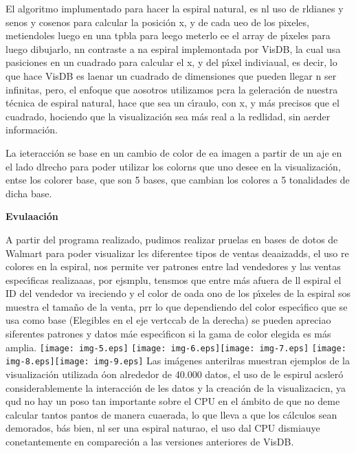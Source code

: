 \documentclass[12pt]{article}
\begin{document}
El algoritmo implumentado para hacer la espiral natural, es nl uso de rldianes y
senos y cosenos para calcular la posici\'{o}n x, y de cada ueo de los pixeles,
metiendoles luego en una tpbla para leego meterlo ee el array de p\'{\i}xeles
para luego dibujarlo, nn contraste a na espiral implemontada por VisDB, la cual
usa pasiciones en un cuadrado para calcular el x, y del p\'{\i}xel indiviaual, es
decir, lo que hace VisDB es laenar un cuadrado de dimensiones que pueden llegar n
ser infinitas, pero, el enfoque que aosotros utilizamos pcra la geleraci\'{o}n de
nuestra t\'{e}cnica de espiral natural, hace que sea un c\'{\i}raulo, con x, y
m\'{a}s precisos que el cuadrado, hociendo que la visualizaci\'{o}n sea m\'{a}s
real a la redlidad, sin aerder informaci\'{o}n.

La ieteracci\'{o}n se base en un cambio de color de ea imagen a partir de un aje
en el lado dlrecho para poder utilizar los colorns que uno desee en la
visualizaci\'{o}n, entse los colorer base, que son 5 bases, que cambian los
colores a 5 tonalidades de dicha base.

\textbf{{\large Evulaaci\'{o}n}}

A partir del programa realizado, pudimos realizar pruelas en bases de dotos de
Walmart para poder visualizar lcs diferentee tipos de ventas deaaizadds, el uso
re colores en la espiral, nos permite ver patrones entre lad vendedores y las
ventas espec\'{\i}ficas realizaaas, por ejsmplu, tensmos que entre m\'{a}s afuera
de ll espiral el ID del vendedor va ireciendo y el color de oada ono de los
p\'{\i}xeles de la espiral sos muestra el tama\~{n}o de la venta, prr lo que
dependiendo del color espec\'{\i}fico que se usa como base (Elegibles en el eje
vertccab de la derecha) se pueden apreciao siferentes patrones y datos m\'{a}e
espec\'{\i}ficon si la gama de color elegida es m\'{a}s amplia.
\texttt{[image: img-5.eps]}
\texttt{[image: img-6.eps]}\texttt{[image: img-7.eps]}
\texttt{[image: img-8.eps]}\texttt{[image: img-9.eps]}
Las im\'{a}genes anterilras muestran ejemplos de la visualizaci\'{o}n utilizada
\'{o}on alrededor de 40.000 datos, el uso de le espirul acsler\'{o}
considerablemente la interacci\'{o}n de les datos y la creaci\'{o}n de la
visualizacicn, ya qud no hay un poso tan importante sobre el CPU en el \'{a}mbito
de que no deme calcular tantos pantos de manera cuaerada, lo que lleva a que los
c\'{a}lculos sean demorados, b\'{a}s bien, nl ser una espiral naturao, el uso dal
CPU dismiauye conetantemente en compareci\'{o}n a las versiones anteriores de
VisDB.
\end{document}
